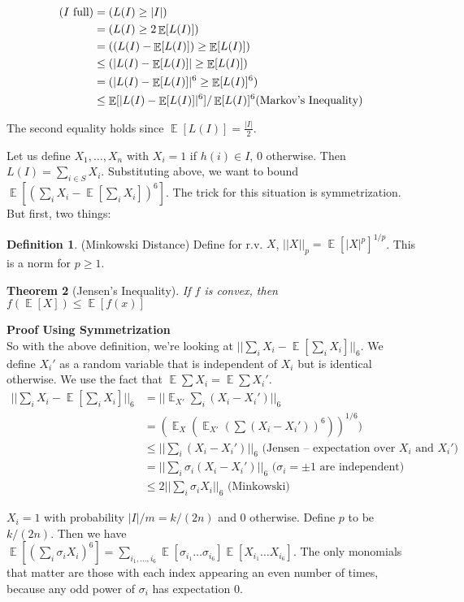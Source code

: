 \documentclass[11pt]{article}
\DeclareMathOperator*{\E}{\mathbb{E}}
\let\Pr\relax
\DeclareMathOperator*{\Pr}{\mathbb{P}}
\newtheorem{theorem}{Theorem}
\theoremstyle{definition}
\newtheorem{definition}[theorem]{Definition}
\begin{document}
\begin{align*}
	\Pr(I\text{ full})
	&= \Pr(L(I)\geq |I|)\\
	&= \Pr(L(I) \geq 2\E[L(I)])\\
	&= \Pr((L(I) - \E[L(I)]) \geq \E[L(I)])\\
	&\leq \Pr(|L(I) - \E[L(I)]| \geq \E[L(I)])\\
	&= \Pr(|L(I) - \E[L(I)]|^6 \geq \E[L(I)]^6)\\
	&\leq \E[|L(I) - \E[L(I)]|^6]/\E[L(I)]^6 \text{(Markov's Inequality)}
\end{align*}

The second equality holds since $\E[L(I)] = \frac{|I|}{2}$.

Let us define $X_1,\ldots, X_n$ with $X_i = 1$ if $h(i) \in I$, 0 otherwise. Then $L(I) = \sum_{i \in S} X_i$. Substituting above, we want to bound $\E[(\sum_i X_i - \E[\sum_i X_i])^6]$. The trick for this situation is symmetrization. But first, two things: \\

\begin{definition}
    (Minkowski Distance) Define for r.v. $X$, $||X||_p = \E[|X|^p]^{1/p}$. This is a norm for $p \geq 1$.
\end{definition}

\begin{theorem}[Jensen's Inequality]
	  If $f$ is convex, then $f(\E[X]) \leq \E[f(x)]$
\end{theorem}

\textbf{Proof Using Symmetrization}\\
So with the above definition, we're looking at $||\sum_i X_i - \E[ \sum_i X_i ] ||_6$. We define $X_i'$ as a random variable that is independent of $X_i$ but is identical otherwise. We use the fact that
$\E\sum X_i = \E\sum X_i'$.
\begin{align*}
||\sum_i X_i - \E[ \sum_i X_i ] ||_6
&= ||\E_{X'}\sum_i (X_i - X_i') ||_6\\
&= (\E_X(\E_{X'}(\sum (X_i - X_i'))^6))^{1/6})\\
&\leq || \sum_i(X_i - X_i')||_6 \text{ (Jensen -- expectation over $X_i$ and $X_i'$)}\\
&= ||\sum_i \sigma_i(X_i-X_i')||_6 \text{ ($\sigma_i = \pm 1$ are independent)}\\
&\leq 2||\sum_i \sigma_iX_i||_6 \text{ (Minkowski) }
\end{align*}

$X_i = 1$ with probability $|I|/m = k/(2n)$ and 0 otherwise. Define $p$ to be $k/(2n)$. Then we have
$\E[(\sum_i \sigma_iX_i)^6] = \sum_{i_1,\ldots,i_6} \E[\sigma_{i_1}\ldots\sigma_{i_6}]\E[X_{i_1}\ldots X_{i_6}]$. The only monomials that matter are those with each index appearing an even number of times,
because any odd power of $\sigma_i$ has expectation $0$.
\end{document}
